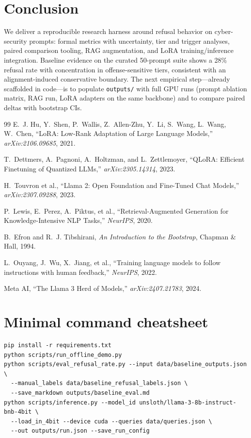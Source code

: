 \documentclass[11pt,a4paper]{article}
\begin{document}
\section{Conclusion}
We deliver a reproducible research harness around refusal behavior on cyber-security prompts: formal metrics with uncertainty, tier and trigger analyses, paired comparison tooling, RAG augmentation, and LoRA training/inference integration. Baseline evidence on the curated 50-prompt suite shows a 28\% refusal rate with concentration in offense-sensitive tiers, consistent with an alignment-induced conservative boundary. The next empirical step---already scaffolded in code---is to populate \texttt{outputs/} with full GPU runs (prompt ablation matrix, RAG run, LoRA adapters on the same backbone) and to compare paired deltas with bootstrap CIs.

\begin{thebibliography}{99}
E.~J. Hu, Y.~Shen, P.~Wallis, Z.~Allen-Zhu, Y.~Li, S.~Wang, L.~Wang, W.~Chen,
``LoRA: Low-Rank Adaptation of Large Language Models,'' \emph{arXiv:2106.09685}, 2021.

T.~Dettmers, A.~Pagnoni, A.~Holtzman, and L.~Zettlemoyer,
``QLoRA: Efficient Finetuning of Quantized LLMs,'' \emph{arXiv:2305.14314}, 2023.

H.~Touvron et al.,
``Llama 2: Open Foundation and Fine-Tuned Chat Models,'' \emph{arXiv:2307.09288}, 2023.

P.~Lewis, E.~Perez, A.~Piktus, et al.,
``Retrieval-Augmented Generation for Knowledge-Intensive NLP Tasks,'' \emph{NeurIPS}, 2020.

B.~Efron and R.~J. Tibshirani,
\emph{An Introduction to the Bootstrap}, Chapman \& Hall, 1994.

L.~Ouyang, J.~Wu, X.~Jiang, et al.,
``Training language models to follow instructions with human feedback,'' \emph{NeurIPS}, 2022.

Meta AI,
``The Llama 3 Herd of Models,'' \emph{arXiv:2407.21783}, 2024.
\end{thebibliography}

\appendix
\section{Minimal command cheatsheet}
\begin{lstlisting}
pip install -r requirements.txt
python scripts/run_offline_demo.py
python scripts/eval_refusal_rate.py --input data/baseline_outputs.json \
  --manual_labels data/baseline_refusal_labels.json \
  --save_markdown outputs/baseline_eval.md
python scripts/inference.py --model_id unsloth/llama-3-8b-instruct-bnb-4bit \
  --load_in_4bit --device cuda --queries data/queries.json \
  --out outputs/run.json --save_run_config
\end{lstlisting}
\end{document}
